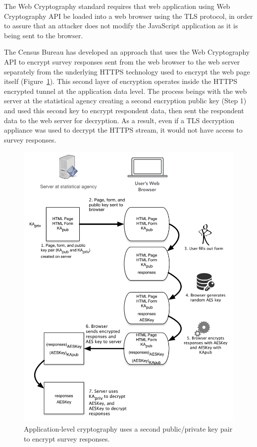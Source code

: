 \documentclass[fleqn,10pt]{wlscirep}
\begin{document}
The Web Cryptography standard requires that web application using Web
Cryptography API be loaded into a web browser using the TLS protocol, in
order to assure that an attacker does not modify the JavaScript
application as it is being sent to the browser.

The Census Bureau has developed an approach that uses the Web
Cryptography API to encrypt survey responses sent from the
web browser to the web server separately from the underlying HTTPS
technology used to encrypt the web page itself (Figure~\ref{app-level-diagram}). This second layer of encryption
operates inside the HTTPS encrypted tunnel at the application data
level. The process beings with the web server at the statistical
agency creating a second encryption public key (Step 1) and used this second
key to encrypt respondent data, then sent the respondent data to the
web server for decryption. As a result, even if a TLS decryption
appliance was used to decrypt the HTTPS stream, it would not have
access to survey responses.

\begin{figure}
  \includegraphics[width=\linewidth]{art/app-level-diagram}
  \caption{Application-level cryptography uses a second public/private
    key pair to encrypt survey responses.\label{app-level-diagram}}
\end{figure}
\end{document}
